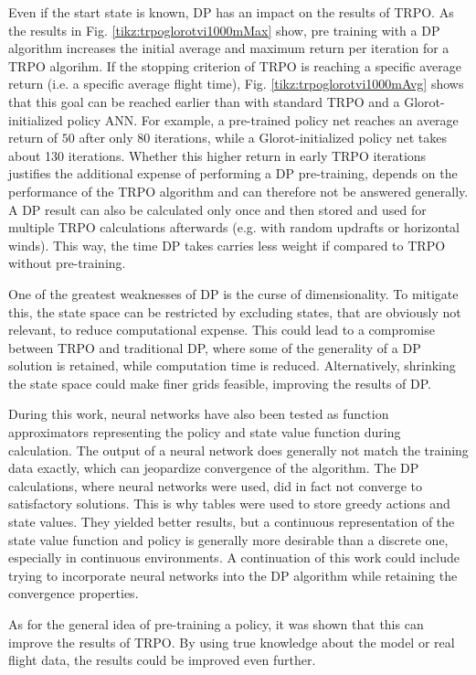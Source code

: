 Even if the start state is known, DP has an impact on the results of TRPO. As the results in Fig. \ref{tikz:trpoglorotvi1000mMax} show, pre training with a DP algorithm increases the initial average and maximum return per iteration for a TRPO algorihm. If the stopping criterion of TRPO is reaching a specific average return (i.e. a specific average flight time), Fig. \ref{tikz:trpoglorotvi1000mAvg} shows that this goal can be reached earlier than with standard TRPO and a Glorot-initialized policy ANN. For example, a pre-trained policy net reaches an average return of $50$ after only 80 iterations, while a Glorot-initialized policy net takes about 130 iterations. Whether this higher return in early TRPO iterations justifies the additional expense of performing a DP pre-training, depends on the performance of the TRPO algorithm and can therefore not be answered generally. A DP result can also be calculated only once and then stored and used for multiple TRPO calculations afterwards (e.g. with random updrafts or horizontal winds). This way, the time DP takes carries less weight if compared to TRPO without pre-training.

One of the greatest weaknesses of DP is the curse of dimensionality. To mitigate this, the state space can be restricted by excluding states, that are obviously not relevant, to reduce computational expense. This could lead to a compromise between TRPO and traditional DP, where some of the generality of a DP solution is retained, while computation time is reduced. Alternatively, shrinking the state space could make finer grids feasible, improving the results of DP.

During this work, neural networks have also been tested as function approximators representing the policy and state value function during calculation. The output of a neural network does generally not match the training data exactly, which can jeopardize convergence of the algorithm. The DP calculations, where neural networks were used, did in fact not converge to satisfactory solutions. This is why tables were used to store greedy actions and state values. They yielded better results, but a continuous representation of the state value function and policy is generally more desirable than a discrete one, especially in continuous environments. A continuation of this work could include trying to incorporate neural networks into the DP algorithm while retaining the convergence properties.

As for the general idea of pre-training a policy, it was shown that this can improve the results of TRPO. By using true knowledge about the model or real flight data, the results could be improved even further.

